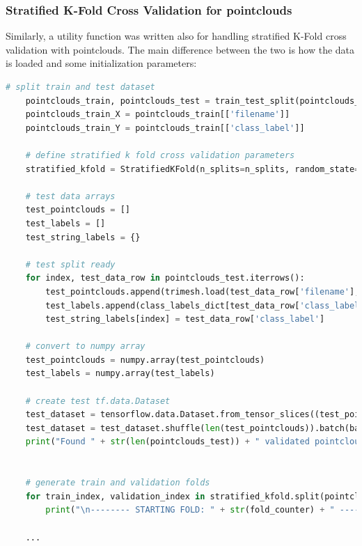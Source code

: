 \documentclass[11pt,a4paper]{article}
\begin{document}
\subsubsection{Stratified K-Fold Cross Validation for pointclouds}
Similarly, a utility function was written also for handling stratified K-Fold cross validation with pointclouds. The main difference between the two is how the data is loaded and some initialization parameters:
\begin{lstlisting}[language=Python,frame=single,caption={Snippet of the function used to perform stratified K-Fold cross validation with pointclouds data showing how samples are loaded using trimesh.},captionpos=b]
    # split train and test dataset
    pointclouds_train, pointclouds_test = train_test_split(pointclouds_data, test_size=test_size, stratify=pointclouds_Y, random_state=42)
    pointclouds_train_X = pointclouds_train[['filename']]
    pointclouds_train_Y = pointclouds_train[['class_label']]

    # define stratified k fold cross validation parameters
    stratified_kfold = StratifiedKFold(n_splits=n_splits, random_state=7, shuffle=shuffle)

    # test data arrays
    test_pointclouds = []
    test_labels = []
    test_string_labels = {}

    # test split ready
    for index, test_data_row in pointclouds_test.iterrows():
        test_pointclouds.append(trimesh.load(test_data_row['filename'], force='mesh').sample(target_size))
        test_labels.append(class_labels_dict[test_data_row['class_label']])
        test_string_labels[index] = test_data_row['class_label']
    
    # convert to numpy array
    test_pointclouds = numpy.array(test_pointclouds)
    test_labels = numpy.array(test_labels)

    # create test tf.data.Dataset
    test_dataset = tensorflow.data.Dataset.from_tensor_slices((test_pointclouds, test_labels))
    test_dataset = test_dataset.shuffle(len(test_pointclouds)).batch(batch_size)
    print("Found " + str(len(pointclouds_test)) + " validated pointcloud filenames belonging to " + str(len(pointclouds_test['class_label'].unique())) + " classes.")


    # generate train and validation folds
    for train_index, validation_index in stratified_kfold.split(pointclouds_train_X, pointclouds_train_Y):
        print("\n-------- STARTING FOLD: " + str(fold_counter) + " --------")

    ...
\end{lstlisting}
\end{document}
